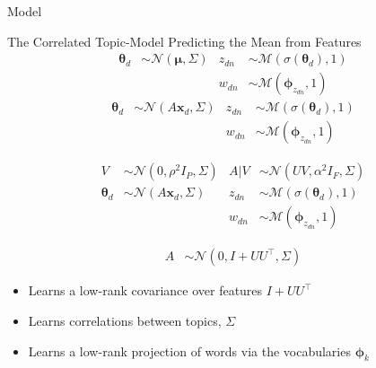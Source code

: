 \documentclass[xcolor=dvipsnames]{beamer}
\newcommand \T { ^\top }
\newcommand \vv[1] { \boldsymbol #1 }
\newcommand \thd[0]  { { \vv \theta_d } }
\newcommand \xd      { { \vv x_d } }
\newcommand \nor[2]   { \mathcal{N} \left( {#1}, {#2} \right) }
\newcommand \mnor[3]  { \mathcal{N} \left(#1, #2, #3\right) }
\newcommand \muln[2]  { \mathcal{M} \left( {#1},{#2} \right) }
\begin{document}
\begin{frame}{Model}

 { The Correlated Topic-Model }
 { Predicting the Mean from Features}
 {
    \begin{align*}
    \vv{\theta}_d & \sim \nor{\vv{\mu}}{\Sigma} & z_{dn} & \sim \muln{\sigma(\thd)}{1} \\
    & & w_{dn} & \sim \muln{\vv{\phi}_{z_{dn}}}{1} 
    \end{align*}
}
 {
    \begin{align*}
    \vv{\theta}_d & \sim \nor{A\xd}{\Sigma} & z_{dn} & \sim \muln{\sigma(\thd)}{1} \\
    & & w_{dn} & \sim \muln{\vv{\phi}_{z_{dn}}}{1} 
    \end{align*}
}

 {
    \begin{align*}
    V & \sim \mnor{0}{\rho^2 I_P}{\Sigma} & A|V & \sim \mnor{UV}{\alpha^2 I_F}{\Sigma} \\
    \vv{\theta}_d & \sim \nor{A\xd}{\Sigma} & z_{dn} & \sim \muln{\sigma(\thd)}{1} \\
    & & w_{dn} & \sim \muln{\vv{\phi}_{z_{dn}}}{1} 
    \end{align*}
}

 {
    \begin{align*}
    A & \sim \mnor{0}{I + UU\T}{\Sigma} 
    \end{align*}
}

 {
    \begin{itemize}
        \item Learns a low-rank covariance over features $I + UU\T$
        \item Learns correlations between topics, $\Sigma$
        \item Learns a low-rank projection of words via the vocabularies $\vv{\phi}_k$
    \end{itemize}
}

\end{frame}
\end{document}
